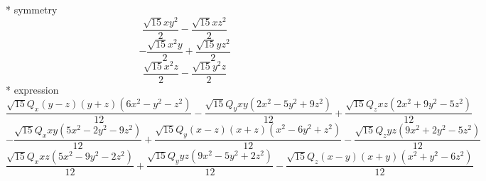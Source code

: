 \documentclass[fleqn,8pt]{jsarticle}
\begin{document}
\noindent\quad ** symmetry
\begin{dmath*}
\frac{\sqrt{15} x y^{2}}{2} - \frac{\sqrt{15} x z^{2}}{2}
\end{dmath*}
\begin{dmath*}
- \frac{\sqrt{15} x^{2} y}{2} + \frac{\sqrt{15} y z^{2}}{2}
\end{dmath*}
\begin{dmath*}
\frac{\sqrt{15} x^{2} z}{2} - \frac{\sqrt{15} y^{2} z}{2}
\end{dmath*}
\noindent\quad ** expression
\begin{dmath*}
\frac{\sqrt{15} Q_{x} \left(y - z\right) \left(y + z\right) \left(6 x^{2} - y^{2} - z^{2}\right)}{12} - \frac{\sqrt{15} Q_{y} x y \left(2 x^{2} - 5 y^{2} + 9 z^{2}\right)}{12} + \frac{\sqrt{15} Q_{z} x z \left(2 x^{2} + 9 y^{2} - 5 z^{2}\right)}{12}
\end{dmath*}
\begin{dmath*}
- \frac{\sqrt{15} Q_{x} x y \left(5 x^{2} - 2 y^{2} - 9 z^{2}\right)}{12} + \frac{\sqrt{15} Q_{y} \left(x - z\right) \left(x + z\right) \left(x^{2} - 6 y^{2} + z^{2}\right)}{12} - \frac{\sqrt{15} Q_{z} y z \left(9 x^{2} + 2 y^{2} - 5 z^{2}\right)}{12}
\end{dmath*}
\begin{dmath*}
\frac{\sqrt{15} Q_{x} x z \left(5 x^{2} - 9 y^{2} - 2 z^{2}\right)}{12} + \frac{\sqrt{15} Q_{y} y z \left(9 x^{2} - 5 y^{2} + 2 z^{2}\right)}{12} - \frac{\sqrt{15} Q_{z} \left(x - y\right) \left(x + y\right) \left(x^{2} + y^{2} - 6 z^{2}\right)}{12}
\end{dmath*}
\end{document}
